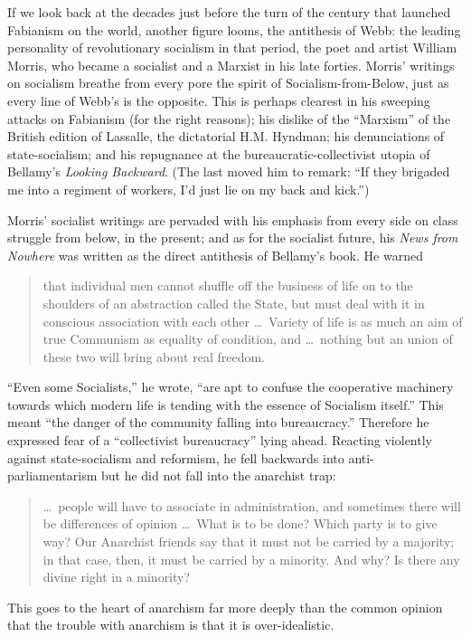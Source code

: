 If we look back at the decades just before the turn of the century that launched Fabianism on the world, another figure looms, the antithesis of Webb: the leading personality of revolutionary socialism in that period, the poet and artist William Morris, who became a socialist and a Marxist in his late forties. Morris' writings on socialism breathe from every pore the spirit of Socialism-from-Below, just as every line of Webb's is the opposite. This is perhaps clearest in his sweeping attacks on Fabianism (for the right reasons); his dislike of the ``Marxism'' of the British edition of Lassalle, the dictatorial H.M. Hyndman; his denunciations of state-socialism; and his repugnance at the bureaucratic-collectivist utopia of Bellamy's \emph{Looking Backward}. (The last moved him to remark: ``If they brigaded me into a regiment of workers, I'd just lie on my back and kick.'')

Morris' socialist writings are pervaded with his emphasis from every side on class struggle from below, in the present; and as for the socialist future, his \emph{News from Nowhere} was written as the direct antithesis of Bellamy's book. He warned

\blockquote{that individual men cannot shuffle off the business of life on to the shoulders of an abstraction called the State, but must deal with it in conscious association with each other \ldots\ Variety of life is as much an aim of true Communism as equality of condition, and \ldots\ nothing but an union of these two will bring about real freedom.}

``Even some Socialists,'' he wrote, ``are apt to confuse the cooperative machinery towards which modern life is tending with the essence of Socialism itself.'' This meant ``the danger of the community falling into bureaucracy.'' Therefore he expressed fear of a ``collectivist bureaucracy'' lying ahead. Reacting violently against state-socialism and reformism, he fell backwards into anti-parliamentarism but he did not fall into the anarchist trap:

\blockquote{\ldots\ people will have to associate in administration, and sometimes there will be differences of opinion \ldots\ What is to be done? Which party is to give way? Our Anarchist friends say that it must not be carried by a majority; in that case, then, it must be carried by a minority. And why? Is there any divine right in a minority?}

This goes to the heart of anarchism far more deeply than the common opinion that the trouble with anarchism is that it is over-idealistic.

